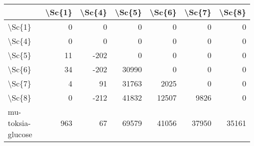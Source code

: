 \begin{tabular}{lrrrrrr}
\toprule
{} &  \textbackslash Sc\{1\} &  \textbackslash Sc\{4\} &  \textbackslash Sc\{5\} &  \textbackslash Sc\{6\} &  \textbackslash Sc\{7\} &  \textbackslash Sc\{8\} \\
\midrule
\textbackslash Sc\{1\}            &       0 &       0 &       0 &       0 &       0 &       0 \\
\textbackslash Sc\{4\}            &       0 &       0 &       0 &       0 &       0 &       0 \\
\textbackslash Sc\{5\}            &      11 &    -202 &       0 &       0 &       0 &       0 \\
\textbackslash Sc\{6\}            &      34 &    -202 &   30990 &       0 &       0 &       0 \\
\textbackslash Sc\{7\}            &       4 &      91 &   31763 &    2025 &       0 &       0 \\
\textbackslash Sc\{8\}            &       0 &    -212 &   41832 &   12507 &    9826 &       0 \\
mu-toksia-glucose &     963 &      67 &   69579 &   41056 &   37950 &   35161 \\
\bottomrule
\end{tabular}
